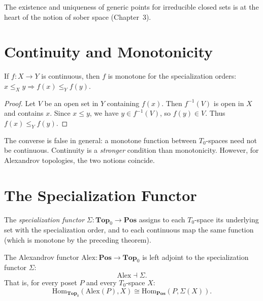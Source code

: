 \begin{remark}
The existence and uniqueness of generic points for irreducible closed sets is at the heart
of the notion of sober space (Chapter~3).
\end{remark}

\section{Continuity and Monotonicity}

\begin{theorem}
If $f\colon X \to Y$ is continuous, then $f$ is monotone for the specialization orders:
$x \leq_X y \Rightarrow f(x) \leq_Y f(y)$.
\end{theorem}

\begin{proof}
Let $V$ be an open set in $Y$ containing $f(x)$. Then $f^{-1}(V)$ is open in $X$ and
contains $x$. Since $x \leq y$, we have $y \in f^{-1}(V)$, so $f(y) \in V$. Thus
$f(x) \leq_Y f(y)$.
\end{proof}

\begin{warning}
The converse is false in general: a monotone function between $T_0$-spaces need not be
continuous. Continuity is a \emph{stronger} condition than monotonicity. However, for
Alexandrov topologies, the two notions coincide.
\end{warning}

\section{The Specialization Functor}

\begin{definition}
The \emph{specialization functor} $\Sigma\colon \mathbf{Top}_0 \to \mathbf{Pos}$ assigns
to each $T_0$-space its underlying set with the specialization order, and to each
continuous map the same function (which is monotone by the preceding theorem).
\end{definition}

\begin{theorem}
The Alexandrov functor $\mathrm{Alex}\colon \mathbf{Pos} \to \mathbf{Top}_0$ is left
adjoint to the specialization functor $\Sigma$:
\[
  \mathrm{Alex} \dashv \Sigma.
\]
That is, for every poset $P$ and every $T_0$-space $X$:
\[
  \mathrm{Hom}_{\mathbf{Top}_0}(\mathrm{Alex}(P), X) \cong
  \mathrm{Hom}_{\mathbf{Pos}}(P, \Sigma(X)).
\]
\end{theorem}

